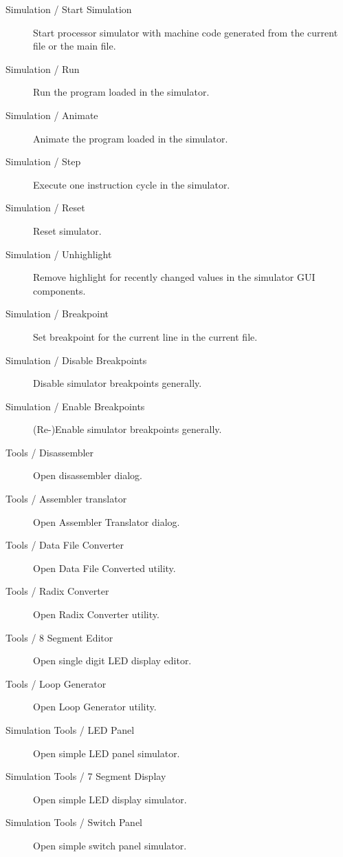 \begin{description}
            \item[Simulation / Start Simulation] Start processor simulator with machine code generated from the current file or the main file.
            \item[Simulation / Run] Run the program loaded in the simulator.
            \item[Simulation / Animate] Animate the program loaded in the simulator.
            \item[Simulation / Step] Execute one instruction cycle in the simulator.
            \item[Simulation / Reset] Reset simulator.
            \item[Simulation / Unhighlight] Remove highlight for recently changed values in the simulator GUI components.
            \item[Simulation / Breakpoint] Set breakpoint for the current line in the current file.
            \item[Simulation / Disable Breakpoints] Disable simulator breakpoints generally.
            \item[Simulation / Enable Breakpoints] (Re-)Enable simulator breakpoints generally.

            \item[Tools / Disassembler] Open disassembler dialog.
            \item[Tools / Assembler translator] Open Assembler Translator dialog.
            \item[Tools / Data File Converter] Open Data File Converted utility.
            \item[Tools / Radix Converter] Open Radix Converter utility.
            \item[Tools / 8 Segment Editor] Open single digit LED display editor.
            \item[Tools / Loop Generator] Open Loop Generator utility.

            \item[Simulation Tools / LED Panel] Open simple LED panel simulator.
            \item[Simulation Tools / 7 Segment Display] Open simple LED display simulator.
            \item[Simulation Tools / Switch Panel] Open simple switch panel simulator.


\end{description}
